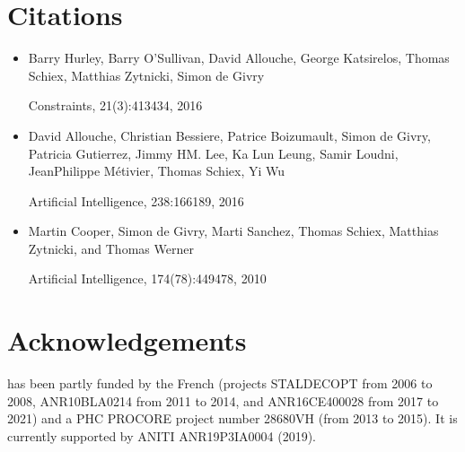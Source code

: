 \documentclass[letterpaper,10pt,openany,oneside,english]{sphinxmanual}
\begin{document}
\chapter{Citations}
\label{\detokenize{presentation:citations}}\label{\detokenize{presentation:id7}}\begin{itemize}
\item {} 
\sphinxAtStartPar
{}

\sphinxAtStartPar
Barry Hurley, Barry O’Sullivan, David Allouche, George Katsirelos, Thomas Schiex, Matthias Zytnicki, Simon de Givry

\sphinxAtStartPar
Constraints, 21(3):413\sphinxhyphen{}434, 2016

\item {} 
\sphinxAtStartPar
{}

\sphinxAtStartPar
David Allouche, Christian Bessiere, Patrice Boizumault, Simon de Givry, Patricia Gutierrez, Jimmy HM. Lee, Ka Lun Leung, Samir Loudni, Jean\sphinxhyphen{}Philippe Métivier, Thomas Schiex, Yi Wu

\sphinxAtStartPar
Artificial Intelligence, 238:166\sphinxhyphen{}189, 2016

\item {} 
\sphinxAtStartPar
{}

\sphinxAtStartPar
Martin Cooper, Simon de Givry, Marti Sanchez, Thomas Schiex, Matthias Zytnicki, and Thomas Werner

\sphinxAtStartPar
Artificial Intelligence, 174(7\sphinxhyphen{}8):449\sphinxhyphen{}478, 2010

\end{itemize}


\chapter{Acknowledgements}
\label{\detokenize{presentation:acknowledgements}}\label{\detokenize{presentation:id8}}
\sphinxAtStartPar
{} has been partly funded by the French  (projects STAL\sphinxhyphen{}DEC\sphinxhyphen{}OPT from 2006 to 2008, ANR\sphinxhyphen{}10\sphinxhyphen{}BLA\sphinxhyphen{}0214  from 2011 to 2014, and ANR\sphinxhyphen{}16\sphinxhyphen{}CE40\sphinxhyphen{}0028  from 2017 to 2021) and a PHC PROCORE project number 28680VH (from 2013 to 2015). It is currently supported by ANITI ANR\sphinxhyphen{}19\sphinxhyphen{}P3IA\sphinxhyphen{}0004 (2019\sphinxhyphen{}).
\end{document}
